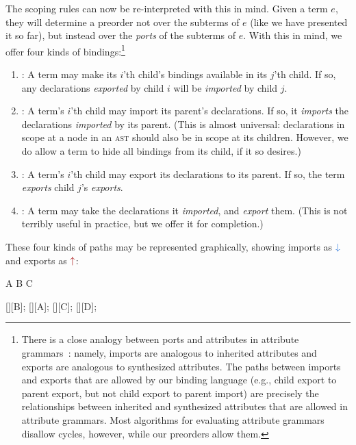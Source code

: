 The scoping rules can now be re-interpreted with this in mind. Given a
term $e$, they will determine a preorder not over the subterms of $e$
(like we have presented it so far), but instead over the \emph{ports}
of the subterms of $e$. With this in mind, we offer four kinds of bindings:\footnote{
  There is a close analogy between ports and attributes in attribute
  grammars~\cite{knuth-attribute-grammar}:
  namely, imports are analogous to inherited
  attributes and exports are analogous to synthesized attributes.
  The paths between imports and exports that are allowed by our
  binding language (e.g., child export to parent export, but not
  child export to parent import) are precisely the relationships
  between inherited and synthesized attributes that are allowed in
  attribute grammars. Most algorithms for evaluating attribute
  grammars disallow cycles, however, while our preorders allow them.
}
\begin{enumerate}
\item[A.] : A term may make its $i$'th child's bindings
  available in its $j$'th child. If so, any declarations
  \emph{exported} by child $i$ will be \emph{imported} by child $j$.
\item[B.] : A term's $i$'th child may import its
  parent's declarations. If so, it \emph{imports} the declarations \emph{imported}
  by its parent. (This is almost universal:
  declarations in scope at a node in an \textsc{ast} should
  also be in scope at its children. However, we do allow a term to
  hide all bindings from its child, if it so desires.)
\item[C.] : A term's $i$'th child may export its
  declarations to its parent. If so, the term \emph{exports} child $j$'s
  \emph{exports}.
\item[D.] \SpecSelf: A term may take the declarations it
  \emph{imported}, and \emph{export} them. (This is not terribly useful
  in practice, but we offer it for completion.)
\end{enumerate}
These four kinds of paths may be represented graphically,
showing imports as $\ImSymbCirc$ and exports as $\ExSymbCirc$:

\begin{center}
\begin{tikzScopeDiagram}
  \tikzRoot
    {A}{
      {B}{}
      {C}{}}
  \begin{tikzEdges}
    [][B];
    [][A];
    [][C];
    [][D];
  \end{tikzEdges}
\end{tikzScopeDiagram}
\end{center}

